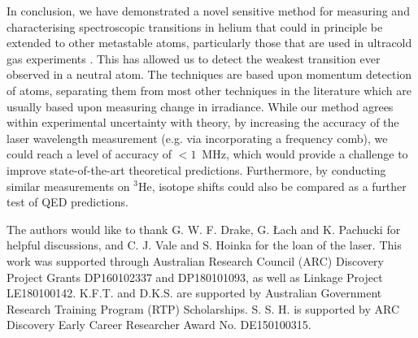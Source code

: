 \documentclass[%
 reprint,
 amsmath,amssymb,
 aps,
 prl,
]{revtex4-2}
\begin{document}
In conclusion, we have demonstrated a novel sensitive method for measuring and characterising spectroscopic transitions in helium that could in principle be extended to other metastable atoms, particularly those that are used in ultracold gas experiments \cite{RevModPhys.84.175}. This has allowed us to detect the weakest transition ever observed in a neutral atom.  The techniques are based upon momentum detection of atoms, separating them from most other techniques in the literature which are usually based upon measuring change in irradiance.  While our method agrees within experimental uncertainty with theory, by increasing the accuracy of the laser wavelength measurement  (e.g. via incorporating a frequency comb), we could reach a level of accuracy of \(<1\)~MHz, which would provide a challenge to improve state-of-the-art theoretical predictions.  Furthermore, by conducting similar measurements on $^3$He, isotope shifts could also be compared as a further test of QED predictions.



\begin{acknowledgments}
The authors would like to thank G. W. F. Drake, G. \L{}ach and K. Pachucki for helpful discussions, and C. J. Vale and S. Hoinka for the loan of the laser.
This work was supported through Australian Research
Council (ARC) Discovery Project Grants DP160102337 and DP180101093, %
as well as Linkage Project LE180100142.
K.F.T. and D.K.S. are supported by Australian Government Research Training Program (RTP) Scholarships.
S. S. H. is supported by ARC Discovery Early Career Researcher Award No. DE150100315.
\end{acknowledgments}


\end{document}
